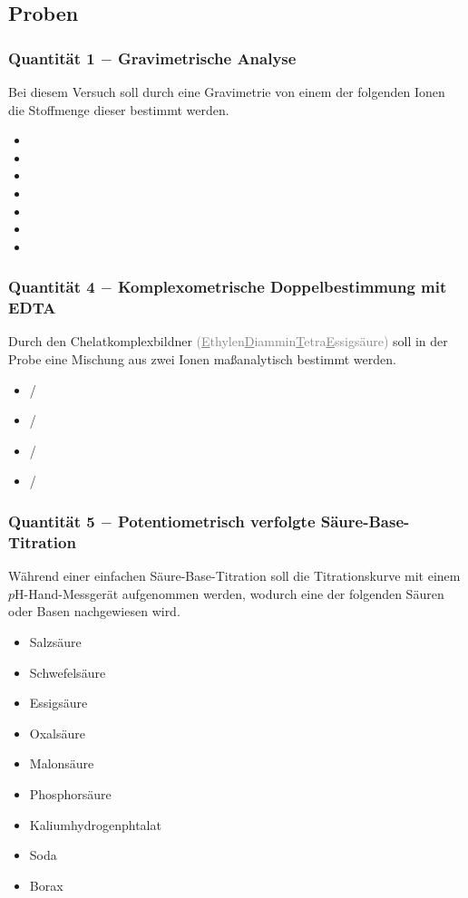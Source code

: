 \documentclass{article}
\begin{document}
\subsection{Proben}


\subsubsection{Quantität 1 $-$ Gravimetrische Analyse}
Bei diesem Versuch soll durch eine Gravimetrie von einem der folgenden Ionen die Stoffmenge dieser bestimmt werden.\\
\begin{itemize}
    \item {}
    \item {}
    \item {}
    \item {}
    \item {}
    \item {}
    \item {}
\end{itemize}

\subsubsection{Quantität 4 $-$ Komplexometrische Doppelbestimmung mit EDTA}
Durch den Chelatkomplexbildner  \textcolor{gray}{(\underline{E}thylen\underline{D}iammin\underline{T}etra\underline{E}ssigsäure)} soll in der Probe eine Mischung aus zwei Ionen maßanalytisch bestimmt werden.
\begin{itemize}
    \item {}/
    \item {}/
    \item {}/
    \item {}/
\end{itemize}

\subsubsection{Quantität 5 $-$ Potentiometrisch verfolgte Säure-Base-Titration}
Während einer einfachen Säure-Base-Titration soll die Titrationskurve mit einem $p$H-Hand-Messgerät aufgenommen werden, wodurch eine der folgenden Säuren oder Basen nachgewiesen wird.
\begin{itemize}
    \item Salzsäure 
    \item Schwefelsäure 
    \item Essigsäure 
    \item Oxalsäure 
    \item Malonsäure 
    \item Phosphorsäure 
    \item Kaliumhydrogenphtalat 
    \item Soda 
    \item Borax 
\end{itemize}
\end{document}
